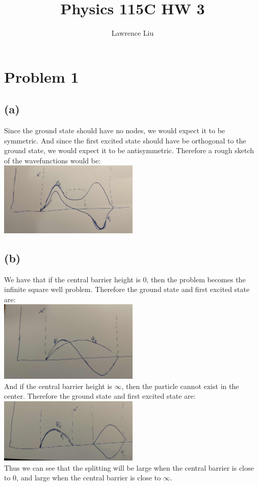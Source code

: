 \documentclass[11pt]{article}
\author{Lawrence Liu}
\title{Physics 115C HW 3}
\begin{document}
\maketitle
\section*{Problem 1}
\subsection*{(a)}
Since the ground state should have no nodes, we would expect it to be 
symmetric. And since the first excited state should have 
be orthogonal to the ground state, we would expect it to be antisymmetric.
Therefore a rough sketch of the wavefunctions would be:
    \\\includegraphics[width=0.5\textwidth]{prob1a.png}
\subsection*{(b)}
We have that if the central barrier height is $0$, then the problem becomes the 
infinite square well problem. Therefore the ground state and first excited state
are:
\\\includegraphics*[width=0.5\textwidth]{prob1b1.png}\\
And if the central barrier height is $\infty$, then the particle cannot exist in the 
center. Therefore the ground state and first excited state are:
\\\includegraphics*[width=0.5\textwidth]{prob1b2.png}\\
Thus we can see that the splitting will be large when the central barrier is close to $0$, and 
large when the central barrier is close to $\infty$.
\end{document}
